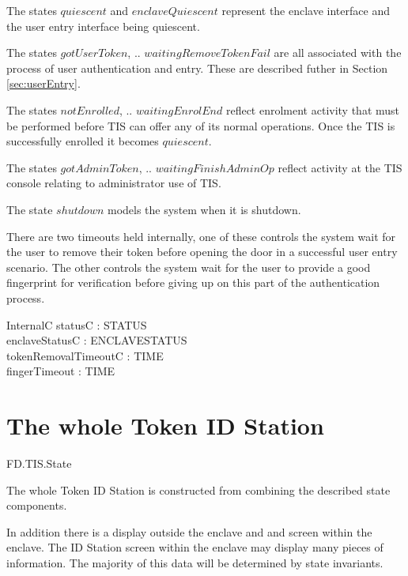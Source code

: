 The states $quiescent$ and $enclaveQuiescent$ represent the enclave
interface and the user entry interface being quiescent.

The states $gotUserToken$, .. 
$waitingRemoveTokenFail$ are all associated with the process of user
authentication and entry. These are described futher in Section \ref{sec:userEntry}.

The states $notEnrolled$, .. $waitingEnrolEnd$ reflect
enrolment activity that must be performed before TIS can offer any of
its normal operations. Once the TIS is successfully enrolled it
becomes $quiescent$.

The states $gotAdminToken$, .. $waitingFinishAdminOp$ 
reflect activity at the TIS console relating to administrator use of TIS. 

The state $shutdown$ models the system when it is shutdown.

There are two timeouts held internally, one of these controls 
the system wait for the user to remove their token before opening the
door in a successful user entry scenario. 
The other controls the system wait for the user to provide a good
fingerprint for verification before giving up on this part of the
authentication process.

\begin{schema}{InternalC}
        statusC : STATUS
\\      enclaveStatusC : ENCLAVESTATUS
\\      tokenRemovalTimeoutC : TIME
\\      fingerTimeout : TIME
\end{schema}


\section{The whole Token ID Station}

\begin{traceunit}{FD.TIS.State}
\end{traceunit}


The whole Token ID Station is constructed from combining the described
state components. 

In addition there is a display outside the enclave and and screen
within the enclave. The ID Station screen within the enclave may
display many pieces of 
information. The majority of this data will be determined by state invariants.

